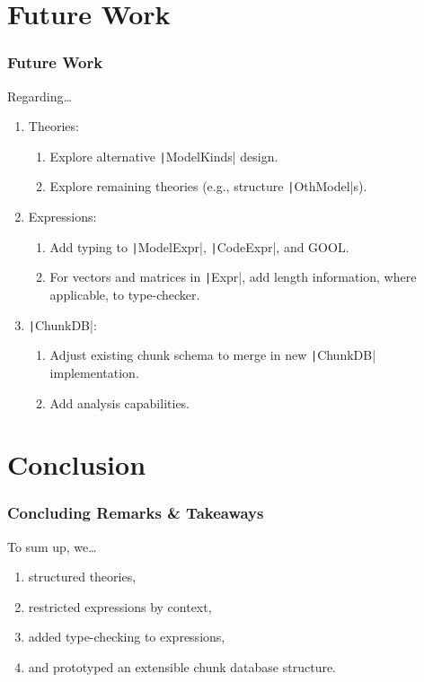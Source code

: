 \documentclass[xcolor={dvipsnames}]{beamer}
\newcommand{\inlineHs}[1]{\texttt|#1|}
\begin{document}
\section{Future Work}

\begin{frame}
  \frametitle{Future Work}

  Regarding\ldots{}
  \begin{enumerate}
    \item Theories:
      \begin{enumerate}
        \item Explore alternative \inlineHs{ModelKinds} design.
        \item Explore remaining theories (e.g., structure \inlineHs{OthModel}s).
      \end{enumerate}
    \item Expressions:
      \begin{enumerate}
        \item Add typing to \inlineHs{ModelExpr}, \inlineHs{CodeExpr}, and GOOL.
        \item For vectors and matrices in \inlineHs{Expr}, add length
              information, where applicable, to type-checker.
      \end{enumerate}
    \item \inlineHs{ChunkDB}:
      \begin{enumerate}
        \item Adjust existing chunk schema to merge in new \inlineHs{ChunkDB}
              implementation.
        \item Add analysis capabilities.
      \end{enumerate}
  \end{enumerate}

\end{frame}

\section{Conclusion}

\begin{frame}
  \frametitle{Concluding Remarks \& Takeaways}

  To sum up, we\ldots{}
  \begin{enumerate}
    \item structured theories,
    \item restricted expressions by context,
    \item added type-checking to expressions,
    \item and prototyped an extensible chunk database structure.
  \end{enumerate}
\end{frame}
\end{document}
